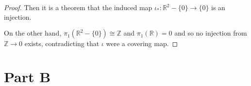 \documentclass{article}
\begin{document}
\begin{enumerate}
\begin{proof}
		Then it is a theorem that the induced map $\iota_*: \mathbb{R}^2 - \{ 0 \} \rightarrow \{ 0 \}$ is an injection. 
		
		On the other hand, $\pi_1 (\mathbb{R}^2 - \{ 0 \}) \cong \mathbb{Z}$ and $\pi_1( \mathbb{R} ) = 0$ and so no injection from $\mathbb{Z} \rightarrow 0$ exists, contradicting that $\iota$ were a covering map.
	\end{proof} 
	
	

	
\end{enumerate}

\section*{Part B}
\end{document}
